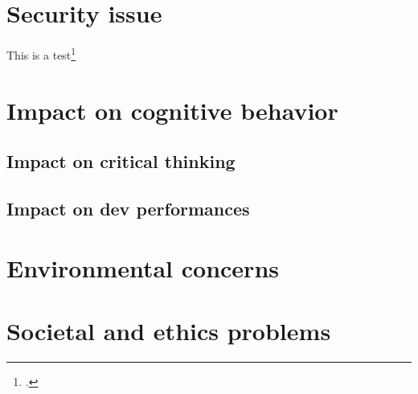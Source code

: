 \documentclass[11pt]{article}
\begin{document}
\section{Security issue}
This is a test\footcite{haoping2025}
\section{Impact on cognitive behavior}
\subsection{Impact on critical thinking}
\subsection{Impact on dev performances}
\section{Environmental concerns}
\section{Societal and ethics problems}

\ifdefined\HCode
\else
{}
\fi
\nocite{*}
\printbibliography
\end{document}
